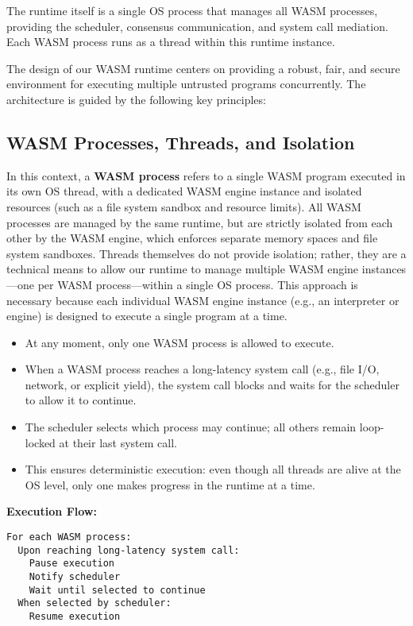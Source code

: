 \documentclass[10pt,a4paper,twocolumn]{IEEEtran}
\begin{document}
The runtime itself is a single OS process that manages all WASM processes, providing the scheduler, consensus communication, and system call mediation. Each WASM process runs as a thread within this runtime instance.

The design of our WASM runtime centers on providing a robust, fair, and secure environment for executing multiple untrusted programs concurrently. The architecture is guided by the following key principles:

\subsection*{WASM Processes, Threads, and Isolation}
In this context, a \textbf{WASM process} refers to a single WASM program executed in its own OS thread, with a dedicated WASM engine instance and isolated resources (such as a file system sandbox and resource limits). All WASM processes are managed by the same runtime, but are strictly isolated from each other by the WASM engine, which enforces separate memory spaces and file system sandboxes. Threads themselves do not provide isolation; rather, they are a technical means to allow our runtime to manage multiple WASM engine instances—one per WASM process—within a single OS process. This approach is necessary because each individual WASM engine instance (e.g., an interpreter or engine) is designed to execute a single program at a time.

\begin{itemize}
    \item At any moment, only one WASM process is allowed to execute.
    \item When a WASM process reaches a long-latency system call (e.g., file I/O, network, or explicit yield), the system call blocks and waits for the scheduler to allow it to continue.
    \item The scheduler selects which process may continue; all others remain loop-locked at their last system call.
    \item This ensures deterministic execution: even though all threads are alive at the OS level, only one makes progress in the runtime at a time.
\end{itemize}

\textbf{Execution Flow:}
\begin{verbatim}
For each WASM process:
  Upon reaching long-latency system call:
    Pause execution
    Notify scheduler
    Wait until selected to continue
  When selected by scheduler:
    Resume execution
\end{verbatim}
\end{document}
